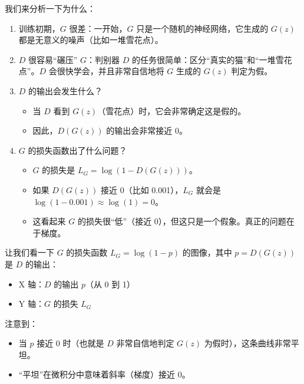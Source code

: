 我们来分析一下为什么：

\begin{enumerate}
\def\labelenumi{\arabic{enumi}.}
\tightlist
\item
  训练初期，\(G\) 很差：一开始，\(G\) 只是一个随机的神经网络，它生成的 \(G(z)\) 都是无意义的噪声（比如一堆雪花点）。
\item
  \(D\) 很容易``碾压'' \(G\)：判别器 \(D\) 的任务很简单：区分``真实的猫''和``一堆雪花点''。\(D\) 会很快学会，并且非常自信地将 \(G\) 生成的 \(G(z)\) 判定为假。
\item
  \(D\) 的输出会发生什么？

  \begin{itemize}
  \tightlist
  \item
    当 \(D\) 看到 \(G(z)\)（雪花点）时，它会非常确定这是假的。
  \item
    因此，\(D(G(z))\) 的输出会非常接近 0。
  \end{itemize}
\item
  \(G\) 的损失函数出了什么问题？

  \begin{itemize}
  \tightlist
  \item
    \(G\) 的损失是 \(L_G=\log(1-D(G(z)))\)。
  \item
    如果 \(D(G(z))\) 接近 0（比如 0.001），\(L_G\) 就会是 \(\log(1-0.001)\approx \log(1)=0\)。
  \item
    这看起来 \(G\) 的损失很``低''（接近 0），但这只是一个假象。真正的问题在于梯度。
  \end{itemize}
\end{enumerate}

让我们看一下 \(G\) 的损失函数 \(L_G=\log(1-p)\) 的图像，其中 \(p=D(G(z))\) 是 \(D\) 的输出：

\begin{itemize}
\tightlist
\item
  X 轴：\(D\) 的输出 \(p\)（从 0 到 1）
\item
  Y 轴：\(G\) 的损失 \(L_G\)
\end{itemize}

注意到：

\begin{itemize}
\tightlist
\item
  当 \(p\) 接近 0 时（也就是 \(D\) 非常自信地判定 \(G(z)\) 为假时），这条曲线非常平坦。
\item
  ``平坦''在微积分中意味着斜率（梯度）接近 0。
\end{itemize}

